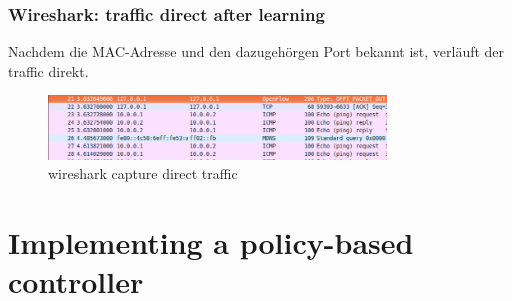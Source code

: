 \documentclass[a4,12pt]{scrartcl}
\begin{document}
\subsubsection{Wireshark: traffic direct after learning}
Nachdem die MAC-Adresse und den dazugehörgen Port bekannt ist, verläuft der traffic direkt. 
\begin{figure} [H]
	\begin{center}
	\includegraphics[width=0.80\textwidth]{./pictures/ex3_paket_direct.png}
	\caption{wireshark capture direct traffic}
	\label{x}
	\end{center}
\end{figure} 
\newpage

\section{Implementing a policy-based controller}
\end{document}
